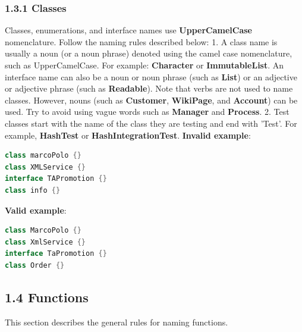 \subsubsection*{\textbf{1.3.1 Classes}}
\leavevmode\newline
\label{sec:1.3.1}
Classes, enumerations, and interface names use \textbf{UpperCamelCase} nomenclature. Follow the naming rules described below:
1.	A class name is usually a noun (or a noun phrase) denoted using the camel case nomenclature, such as UpperCamelCase. For example: \textbf{Character} or \textbf{ImmutableList}.
An interface name can also be a noun or noun phrase (such as \textbf{List}) or an adjective or adjective phrase (such as \textbf{Readable}).
Note that verbs are not used to name classes. However, nouns (such as \textbf{Customer}, \textbf{WikiPage}, and \textbf{Account}) can be used. Try to avoid using vague words such as \textbf{Manager} and \textbf{Process}.
2.	Test classes start with the name of the class they are testing and end with 'Test'. For example, \textbf{HashTest} or \textbf{HashIntegrationTest}.
\textbf{Invalid example}: 
\begin{lstlisting}[language=Kotlin]
class marcoPolo {} 
class XMLService {} 
interface TAPromotion {}
class info {}
\end{lstlisting}
\textbf{Valid example}: 
\begin{lstlisting}[language=Kotlin]
class MarcoPolo {}
class XmlService {}
interface TaPromotion {}
class Order {}
\end{lstlisting}
\subsection*{\textbf{1.4 Functions}}
\label{sec:1.4}
This section describes the general rules for naming functions.

